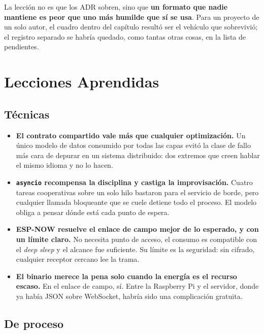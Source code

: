 La lección no es que los ADR sobren, sino que \textbf{un formato que nadie mantiene
es peor que uno más humilde que sí se usa}. Para un proyecto de un solo autor, el
cuadro dentro del capítulo resultó ser el vehículo que sobrevivió; el registro
separado se habría quedado, como tantas otras cosas, en la lista de pendientes.

\section{Lecciones Aprendidas}

\subsection*{Técnicas}

\begin{itemize}[leftmargin=*, label=--]
    \item \textbf{El contrato compartido vale más que cualquier optimización.}
          Un único modelo de datos consumido por todas las capas evitó la clase de
          fallo más cara de depurar en un sistema distribuido: dos extremos que
          creen hablar el mismo idioma y no lo hacen.
    \item \textbf{\texttt{asyncio} recompensa la disciplina y castiga la
          improvisación.} Cuatro tareas cooperativas sobre un solo hilo bastaron
          para el servicio de borde, pero cualquier llamada bloqueante que se cuele
          detiene todo el proceso. El modelo obliga a pensar dónde está cada
          punto de espera.
    \item \textbf{ESP-NOW resuelve el enlace de campo mejor de lo esperado, y con
          un límite claro.} No necesita punto de acceso, el consumo es compatible
          con el \textit{deep sleep} y el alcance fue suficiente. Su límite es la
          seguridad: sin cifrado, cualquier receptor cercano lee la trama.
    \item \textbf{El binario merece la pena solo cuando la energía es el
          recurso escaso.} En el enlace de campo, sí. Entre la Raspberry Pi y el
          servidor, donde ya había JSON sobre WebSocket, habría sido una
          complicación gratuita.
\end{itemize}

\subsection*{De proceso}

